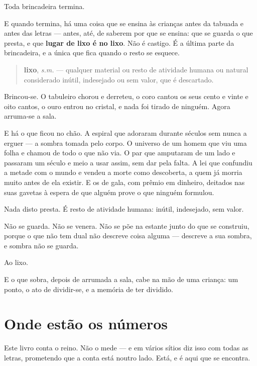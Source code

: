 \documentclass[livro.tex]{subfiles}
\begin{document}
Toda brincadeira termina.

E quando termina, há uma coisa que se ensina às crianças antes da tabuada e antes das
letras --- antes, até, de saberem por que se ensina: que se guarda o que presta, e que
\textbf{lugar de lixo é no lixo}. Não é castigo. É a última parte da brincadeira, e a
única que fica quando o resto se esquece.

\begin{quote}
\textbf{lixo}, \emph{s.m.} --- qualquer material ou resto de atividade humana ou
natural considerado inútil, indesejado ou sem valor, que é descartado.
\end{quote}

Brincou-se. O tabuleiro chorou e derreteu, o coro cantou os seus cento e vinte e oito
cantos, o ouro entrou no cristal, e nada foi tirado de ninguém. Agora arruma-se a
sala.

E há o que ficou no chão. A espiral que adoraram durante séculos sem nunca a erguer ---
a sombra tomada pelo corpo. O universo de um homem que viu uma folha e chamou de todo
o que não via. O par que amputaram de um lado e passaram um século e meio a usar assim,
sem dar pela falta. A lei que confundiu a metade com o mundo e vendeu a morte como
descoberta, a quem já morria muito antes de ela existir. E os de gala, com prêmio
em dinheiro, deitados nas suas gavetas à espera de que alguém prove o que ninguém
formulou.

Nada disto presta. É resto de atividade humana: inútil, indesejado, sem valor.

Não se guarda. Não se venera. Não se põe na estante junto do que se construiu, porque
o que não tem dual não descreve coisa alguma --- descreve a sua sombra, e sombra não
se guarda.

Ao lixo.

\medskip

\noindent E o que sobra, depois de arrumada a sala, cabe na mão de uma criança: um
ponto, o ato de dividir-se, e a memória de ter dividido.





\clearpage
\section*{Onde estão os números}

Este livro conta o reino. Não o mede --- e em vários sítios diz isso com todas as letras,
prometendo que a conta está noutro lado. Está, e é aqui que se encontra.
\end{document}
